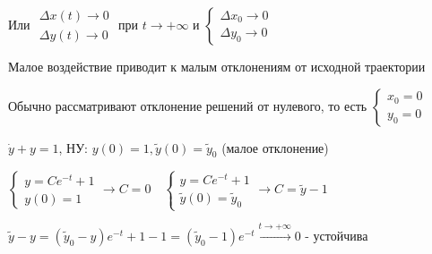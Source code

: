 \documentclass[12pt]{article}
\begin{document}
    Или $\begin{matrix}\Delta x (t) \to 0 \\ \Delta y (t) \to 0\end{matrix}$ при $t \to +\infty$ и $\begin{cases}\Delta x_0 \to 0 \\ \Delta y_0 \to 0\end{cases}$

    \Nota Малое воздействие приводит к малым отклонениям от исходной траектории

    \Nota Обычно рассматривают отклонение решений от нулевого, то есть $\begin{cases}x_0 = 0 \\ y_0 = 0\end{cases}$

    \Ex $\dot y + y = 1$, НУ: $y(0) = 1, \tilde{y}(0) = \tilde{y}_0$ (малое отклонение)

    $\begin{cases}y = Ce^{-t} + 1 \\ y(0) = 1\end{cases} \rightarrow C = 0 \quad
    \begin{cases}y = Ce^{-t} + 1 \\ \tilde{y}(0) = \tilde{y}_0\end{cases} \to C = \tilde{y} - 1$

    $\tilde{y} - y = (\tilde{y}_0 - y) e^{-t} + 1 - 1 = (\tilde{y}_0 - 1)e^{-t} \stackrel{t \to +\infty}{\longrightarrow} 0$ - устойчива{\Large 🥳}
\end{document}
